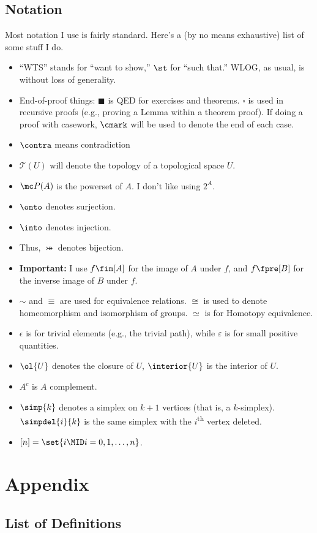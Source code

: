 \documentclass[verbose]{fkbook}
\begin{document}
\section*{Notation}
Most notation I use is fairly standard. Here's a (by no means exhaustive) list
of some stuff I do.
\begin{itemize}
  \item ``WTS'' stands for ``want to show,'' $\st$ for ``such that.'' WLOG, as
    usual, is without loss of generality.
  \item End-of-proof things: $\blacksquare$ is QED for exercises and theorems.
    $\square$ is used in recursive proofs (e.g., proving a Lemma within a
    theorem proof). If doing a proof with casework, $\cmark$ will be used to
    denote the end of each case.
  \item $\contra$ means contradiction
  \item $\mathscr{T}(U)$ will denote the topology of a topological space $U$.
  \item $\mc P(A)$ is the powerset of $A$. I don't like using $2^A$.
  \item $\onto$ denotes surjection.
  \item $\into$ denotes injection.
  \item Thus, $\bij$ denotes bijection.
  \item \textbf{Important:} I use $f\fim[A]$ for the image of $A$ under $f$, and
    $f\fpre[B]$ for the inverse image of $B$ under $f$.
  \item $\sim$ and $\equiv$ are used for equivalence relations. $\cong$ is used
    to denote homeomorphism and isomorphism of groups. $\simeq$ is for Homotopy
    equivalence.
  \item $\epsilon$ is for trivial elements (e.g., the trivial path), while
    $\varepsilon$ is for small positive quantities.
  \item $\ol{U}$ denotes the closure of $U$, $\interior{U}$ is the interior of
    $U$.
  \item $A^c$ is $A$ complement.
  \item $\simp{k}$ denotes a simplex on $k+1$ vertices (that is, a $k$-simplex).
    $\simpdel{i}{k}$ is the same simplex with the $i$\textsuperscript{th} vertex
    deleted.
  \item $[n] = \set{i \MID i = 0,1,\ldots, n}$.
\end{itemize}

\mainmatter

\pagestyle{main}
\setcounter{chapter}{14}


\setcounter{chapter}{17}




\chapter{Appendix}
\section{List of Definitions}
\listofdefinitions
\end{document}
